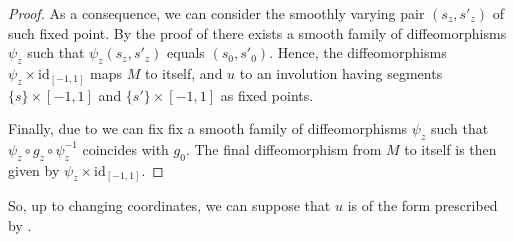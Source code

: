 \documentclass[a4paper, 11pt]{amsart}
\theoremstyle{plain}
\theoremstyle{definition}
\newcommand{\id}{\text{id}}
\begin{document}
\begin{proof}
	As a consequence, we can consider the smoothly varying pair $(s_z,s'_z)$ of such fixed point. By the proof of  there exists a smooth family of diffeomorphisms $\psi_z$ such that $\psi_z(s_z, s'_z)$ equals $(s_0,s'_0)$. Hence, the diffeomorphisms $\psi_z \times \id_{[-1,1]}$ maps $M$ to itself, and $u$ to an involution having segments $\{s\} \times [-1,1]$ and $\{s'\} \times [-1,1]$ as fixed points.
	
	Finally, due to  we can fix fix a smooth family of diffeomorphisms $\psi_z$ such that $\psi_z \circ g_z \circ \psi_z^{-1}$ coincides with $g_0$. The final diffeomorphism from $M$ to itself is then given by $\psi_z \times \id_{[-1,1]}$.
\end{proof}

So, up to changing coordinates, we can suppose that $u$ is of the form prescribed by .
\end{document}
